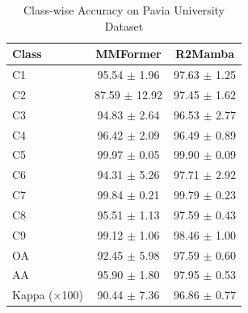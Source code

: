 \begin{table}[htbp]
\centering
\caption{Class-wise Accuracy on Pavia University Dataset}
\label{tab:pavia university_classwise}
\begin{tabular}{lcc}
\toprule
Class & MMFormer & R2Mamba \\
\midrule
C1 & 95.54 $\pm$ 1.96 & 97.63 $\pm$ 1.25 \\
C2 & 87.59 $\pm$ 12.92 & 97.45 $\pm$ 1.62 \\
C3 & 94.83 $\pm$ 2.64 & 96.53 $\pm$ 2.77 \\
C4 & 96.42 $\pm$ 2.09 & 96.49 $\pm$ 0.89 \\
C5 & 99.97 $\pm$ 0.05 & 99.90 $\pm$ 0.09 \\
C6 & 94.31 $\pm$ 5.26 & 97.71 $\pm$ 2.92 \\
C7 & 99.84 $\pm$ 0.21 & 99.79 $\pm$ 0.23 \\
C8 & 95.51 $\pm$ 1.13 & 97.59 $\pm$ 0.43 \\
C9 & 99.12 $\pm$ 1.06 & 98.46 $\pm$ 1.00 \\
\midrule
OA & 92.45 $\pm$ 5.98 & 97.59 $\pm$ 0.60 \\
AA & 95.90 $\pm$ 1.80 & 97.95 $\pm$ 0.53 \\
Kappa ($\times$100) & 90.44 $\pm$ 7.36 & 96.86 $\pm$ 0.77 \\
\bottomrule
\end{tabular}
\end{table}